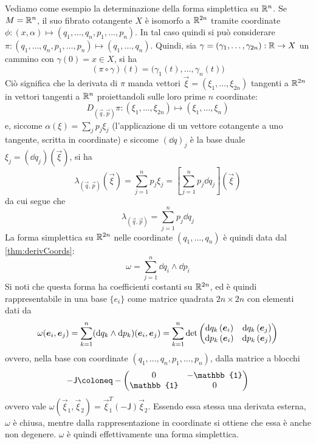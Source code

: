 Vediamo come esempio la determinazione della forma simplettica su $\mathbb{R}^{n}$. Se $M = \mathbb{R}^{n}$, il suo fibrato cotangente $X$ è isomorfo a $\mathbb{R}^{2n}$ tramite coordinate $\phi: (x, \alpha) \mapsto (q_1, \ldots, q_n, p_1, \ldots, p_n)$. In tal caso quindi si può considerare $\pi: (q_1, \ldots, q_n, p_1, \ldots, p_n) \mapsto  (q_1, \ldots, q_n)$. Quindi, sia $\gamma = (\gamma_1, \ldots, \gamma_{2n}):\mathbb{R} \to X$ un cammino con $\gamma(0) = x \in X$, si ha \begin{equation}
(\pi \circ {\gamma}) (t) = \big({\gamma}_1(t), \ldots, {\gamma}_n (t)\big)
\end{equation} 
Ciò significa che la derivata di $\pi$ manda vettori $\vec{\xi} = (\xi_1, \ldots, \xi_{2n})$ tangenti a $\mathbb{R}^{2n}$ in vettori tangenti a $\mathbb{R}^{n}$ proiettandoli sulle loro prime $n$ coordinate:
\begin{equation}
  D_{(\vec{q},\vec{p})}\pi: (\xi_1, \ldots, \xi_{2n}) \mapsto  (\xi_1, \ldots, \xi_n)
\end{equation}
e, siccome $\alpha(\xi) = \sum_j p_j \xi_j$ (l'applicazione di un vettore cotangente a uno tangente, scritta in coordinate) e siccome $(\dd{q})_j$ è la base duale $\xi_j = (\dd{q}_j)(\vec{\xi})$, si ha \begin{equation}
\lambda_{(\vec{q},\vec{p})} (\vec{\xi}) = \sum_{j=1}^n p_j \xi_j = \left[\sum_{j=1}^n p_j \dd{q_j}\right] (\vec{\xi})
\end{equation} 
da cui segue che \begin{equation}
  \lambda_{(\vec{q},\vec{p})} = \sum_{j=1}^n p_j \dd{q_j}
\end{equation} 
La forma simplettica su $\mathbb{R}^{2n}$ nelle coordinate $(q_1, \ldots, q_n)$ è quindi data dal \autoref{thm:derivCoords}: 
\begin{equation} \label{eq:R2nSympForm}
\omega = \sum_{j=1}^n \dd{q_i} \wedge \dd{p_i}
\end{equation} 
Si noti che questa forma ha coefficienti costanti su $\mathbb{R}^{2n}$, ed è quindi rappresentabile in una base $\{e_i\}$ come matrice quadrata $2n \times 2n$ con elementi dati da 
\begin{equation}
\omega(\vec{e}_i, \vec{e}_j) = \sum_{k=1}^{n} (\dd{q_k} \wedge \dd{p_k})(\vec{e}_i, \vec{e}_j) = \sum_{k=1}^{n} \det\pmqty{\dd{q_k}(\vec{e}_i) & \dd{q_k}(\vec{e}_j) \\\dd{p_k}(\vec{e}_i) & \dd{p_k}(\vec{e}_j)}
\end{equation}
ovvero, nella base con coordinate $(q_1, \ldots, q_n, p_1, \ldots, p_n)$, dalla matrice a blocchi
\begin{equation}
- \mathsf{J} \defeq - \pmqty{0 & -\mathbb{1} \\ \mathbb{1} & 0}
\end{equation} 
ovvero vale $\omega(\vec{\xi}_1, \vec{\xi}_2) = \vec{\xi}_1^T (-\mathsf{J}) \vec{\xi}_2$. Essendo essa stessa una derivata esterna, $\omega$ è chiusa, mentre dalla rappresentazione in coordinate si ottiene che essa è anche non degenere. $\omega$ è quindi effettivamente una forma simplettica.

